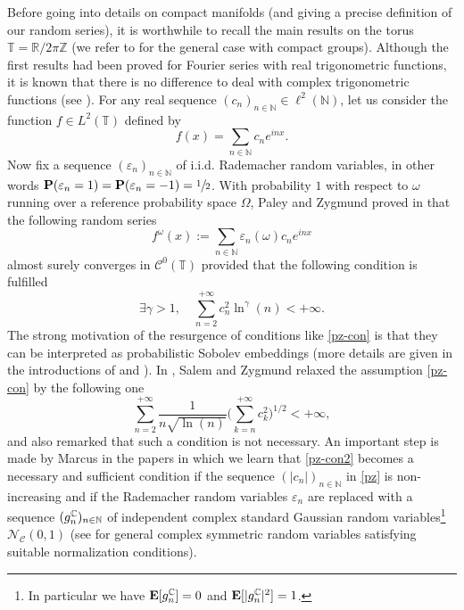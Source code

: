 \documentclass[11pt]{article}
\theoremstyle{theorem}
\theoremstyle{definition}
\newcommand\R{\mathbb{R}}
\newcommand\E{\mathbf{E}}
\newcommand\N{\mathbb{N}}
\newcommand\Z{\mathbb{Z}}
\newcommand\CC{\mathcal{C}}
\newcommand\ep{\varepsilon}
\begin{document}
Before going into details on compact manifolds (and giving a precise definition of our random series), it is worthwhile to recall the main results on the torus $\mathbb{T}=\R/ 2\pi \Z$ (we refer to \cite{pisier1981} for the general case with compact groups). Although the first results had been proved for Fourier series with real trigonometric functions, it is known that there is no difference to deal with complex trigonometric functions (see \cite[p.\,122]{pisier1981}). For any real sequence $(c_n)_{n\in \N}\in \ell^2(\N)$, let us consider the function $f\in L^2(\mathbb{T})$ defined by
\begin{equation*}
f(x)=\sum_{n\in \N}c_n e^{inx}.
\end{equation*}
Now fix a sequence $(\varepsilon_n)_{n\in \N}$ of i.i.d. Rademacher random variables, in other words $\mathbf{P}(\varepsilon_n=1)=\mathbf{P}(\varepsilon_n=-1)=\sfrac{1}{2}$.
With probability $1$ with respect to $\omega$ running over a reference probability space $\Omega$, Paley and Zygmund proved in \cite[p.\,347]{paley1930} that the following random series
\begin{equation}\label{pz}
f^\omega(x):=\sum_{n\in \N}\varepsilon_n(\omega) c_n e^{inx}
\end{equation}
almost surely converges in $\CC^0(\mathbb{T})$ provided that the following condition is fulfilled
\begin{equation}\label{pz-con}
\exists \gamma>1, \quad \sum_{n=2}^{+\infty} c_n^2 \ln^{\gamma}(n)<+\infty.
\end{equation}
The strong motivation of the resurgence of conditions like \eqref{pz-con} is that they can be interpreted as probabilistic Sobolev embeddings (more details are given in the introductions of \cite{Tzvetkov4,burq-lebeau} and \cite[p.\,2734]{imek-aif}).
In \cite[p.\,291]{salem1954}, Salem and Zygmund relaxed the assumption \eqref{pz-con} by the following one
\begin{equation}\label{pz-con2}
\sum_{n=2}^{+\infty} \frac{1}{n\sqrt{\ln(n)}}\biggl(\sum_{k=n}^{+\infty}c_k^2 \biggr)^{1/2} <+\infty,
\end{equation}
and also remarked that such a condition is not necessary.
An important step is made by Marcus in the papers \cite{marcus1973,marcus1975} in which we learn that \eqref{pz-con2} becomes a necessary and sufficient condition if the sequence $(|c_n|)_{n\in \N}$ in \eqref{pz} is non-increasing and if the Rademacher random variables $\ep_n$ are replaced with a sequence $(g_n^{\C})_{n\in \N}$ of independent complex standard Gaussian random variables\footnote{In particular we have $\E[g_n^\C]=0$ and $\E[|g_n^\C|^2]=1$.} $\mathcal{N}_\mathcal{C}(0,1)$ (see \cite{marcus1975} for general complex symmetric random variables satisfying suitable normalization conditions).
\end{document}
